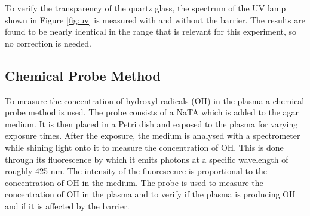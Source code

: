 To verify the transparency of the quartz glass, the spectrum of the UV lamp shown in Figure \ref{fig:uv} is measured with and without the barrier. The results are found to be nearly identical in the range that is relevant for this experiment, so no correction is needed. 

\subsection{Chemical Probe Method}
\label{sec:chemical_probe}
To measure the concentration of hydroxyl radicals (OH) in the plasma a chemical probe method is used. The probe consists of a NaTA which is added to the agar medium. It is then placed in a Petri dish and exposed to the plasma for varying exposure times. After the exposure, the medium is analysed with a spectrometer while shining light onto it to measure the concentration of OH. This is done through its fluorescence by which it emits photons at a specific wavelength of roughly 425 nm. The intensity of the fluorescence is proportional to the concentration of OH in the medium. The probe is used to measure the concentration of OH in the plasma and to verify if the plasma is producing OH and if it is affected by the barrier. 